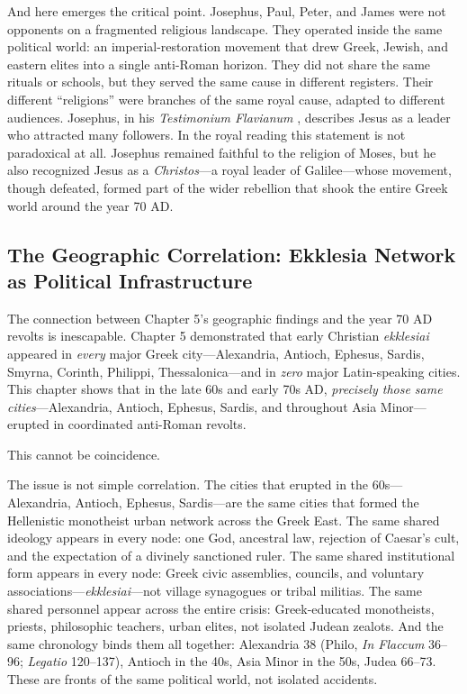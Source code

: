 And here emerges the critical point.
Josephus, Paul, Peter, and James were not opponents on a fragmented religious landscape.
They operated inside the same political world: an imperial-restoration movement that drew Greek, Jewish, and eastern elites into a single anti-Roman horizon.
They did not share the same rituals or schools, but they served the same cause in different registers.
Their different ``religions'' were branches of the same royal cause, adapted to different audiences.
Josephus, in his \textit{Testimonium Flavianum} \cite[18.63--64]{josephus:ant}, describes Jesus as a leader who attracted many followers.
In the royal reading this statement is not paradoxical at all.
Josephus remained faithful to the religion of Moses, but he also recognized Jesus as a \textit{Christos}---a royal leader of Galilee---whose movement, though defeated, formed part of the wider rebellion that shook the entire Greek world around the year 70 AD.

\subsection{The Geographic Correlation: Ekklesia Network as Political Infrastructure}

The connection between Chapter 5's geographic findings and the year 70 AD revolts is inescapable.
Chapter 5 demonstrated that early Christian \emph{ekklesiai} appeared in \emph{every} major Greek city---Alexandria, Antioch, Ephesus, Sardis, Smyrna, Corinth, Philippi, Thessalonica---and in \emph{zero} major Latin-speaking cities.
This chapter shows that in the late 60s and early 70s AD, \emph{precisely those same cities}---Alexandria, Antioch, Ephesus, Sardis, and throughout Asia Minor---erupted in coordinated anti-Roman revolts.

This cannot be coincidence.

The issue is not simple correlation.
The cities that erupted in the 60s---Alexandria, Antioch, Ephesus, Sardis---are the same cities that formed the Hellenistic monotheist urban network across the Greek East.
The same shared ideology appears in every node: one God, ancestral law, rejection of Caesar's cult, and the expectation of a divinely sanctioned ruler.
The same shared institutional form appears in every node: Greek civic assemblies, councils, and voluntary associations---\emph{ekklesiai}---not village synagogues or tribal militias.
The same shared personnel appear across the entire crisis: Greek-educated monotheists, priests, philosophic teachers, urban elites, not isolated Judean zealots.
And the same chronology binds them all together: Alexandria 38 (Philo, \emph{In Flaccum} 36--96; \emph{Legatio} 120--137), Antioch in the 40s, Asia Minor in the 50s, Judea 66--73.
These are fronts of the same political world, not isolated accidents.


